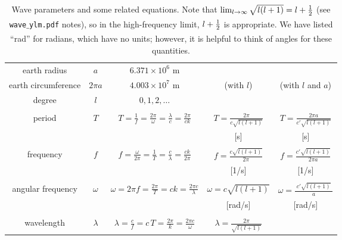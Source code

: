 \begin{table}[h]
\caption[Wave parameters and some related equations]
{{
Wave parameters and some related equations.
Note that $\lim_{l\rightarrow \infty } \sqrt{l(l+1)} = l + \hlf$ (see {\tt wave$\_$ylm.pdf} notes), so in the high-frequency limit, $l + \hlf$ is appropriate.
We have listed ``rad'' for radians, which have no units; however, it is helpful to think of angles for these quantities.
\label{tab:waveparm}
}}
\hspace{-1cm}
\begin{tabular}{||c|c|c|c|c||}
\hline
%
earth radius & \hspace{10pt} $a$ \hspace{10pt}
& $6.371 \times 10^6$ m & & \\
\cline{1-3}
earth circumference & $2\pi a$ & $4.003 \times 10^7$ m & (with $l$) & (with $l$ and $a$)  \\
\cline{1-3}
%
degree	& $l$ & $0,1,2,\ldots$ & & \\
\hline
%
& & & & \\
period		& $T$
& $T = \frac{1}{f} = \frac{2\pi}{\omega} = \frac{\lambda}{c} = \frac{2\pi}{c k}$ 
& $T = \frac{2\pi}{c\sqrt{l(l+1)}}$ 
& $T = \frac{2\pi a}{c'\sqrt{l(l+1)}}$
\\
& & & [s] & [s] \\ \hline
%
& & & & \\
frequency	& $f$
& $f = \frac{\omega}{2\pi} = \frac{1}{T} = \frac{c}{\lambda} = \frac{ck}{2\pi}$ 
& $f = \frac{c\sqrt{l(l+1)}}{2\pi}$
& $f = \frac{c'\sqrt{l(l+1)}}{2\pi a}$
\\
& & & [1/s] & [1/s] \\ \hline
%
& & & & \\
angular frequency	& $\omega$		
& $\omega = 2\pi f = \frac{2\pi}{T} = ck = \frac{2\pi c}{\lambda}$
& $\omega = c\sqrt{l(l+1)}$
& $\omega = \frac{\;c'\sqrt{l(l+1)}\;}{a}$
\\
& & & [rad/s] & [rad/s] \\ \hline\hline
%
& & & & \\
wavelength	& $\lambda$		
& $\lambda = \frac{c}{f} = c\,T = \frac{2\pi}{k} = \frac{2\pi c}{\omega}$
& $\lambda = \frac{2\pi}{\sqrt{l(l+1)}}$

\end{tabular}
\end{table}

